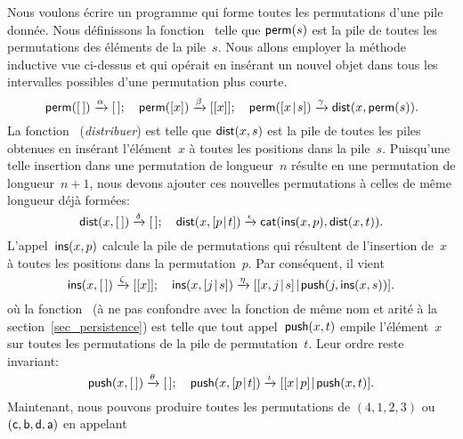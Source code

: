 Nous voulons écrire un programme qui forme toutes les permutations
d'une pile donnée. Nous définissons la
fonction~ telle que
\(\textsf{perm}(s)\) est la pile de toutes les permutations des éléments
de la pile~\(s\). Nous allons employer la méthode inductive vue
ci-dessus et qui opérait en insérant un nouvel objet dans tous les
intervalles possibles d'une permutation plus courte.
\begin{equation*}
\textsf{perm}([\,])         \xrightarrow{\smash{\alpha}} [\,];\quad
\textsf{perm}([x])         \xrightarrow{\smash{\beta}} [[x]];\quad
\textsf{perm}([{x}\!\mid\!{s}]) \xrightarrow{\gamma}
                          \textsf{dist}(x,\textsf{perm}(s)).
\end{equation*}
La fonction~ (\emph{distribuer})
est telle que \(\textsf{dist}(x,s)\) est la pile de toutes les piles
obtenues en insérant l'élément~\(x\) à toutes les positions dans la
pile~\(s\). Puisqu'une telle insertion dans une permutation de
longueur~\(n\) résulte en une permutation de longueur~\(n+1\), nous
devons ajouter ces nouvelles permutations à celles de même longueur
déjà formées:
\begin{equation*}
\textsf{dist}(x,[\,])         \xrightarrow{\smash{\delta}} [\,];\quad
\textsf{dist}(x,[{p}\!\mid\!{t}]) \xrightarrow{\smash{\epsilon}}
                            \textsf{cat}(\textsf{ins}(x,p),\textsf{dist}(x,t)).
\end{equation*}
L'appel~\(\textsf{ins}(x,p)\) calcule la pile de
permutations qui résultent de l'insertion de~\(x\) à toutes les
positions dans la permutation~\(p\). Par conséquent, il vient
\begin{equation*}
\textsf{ins}(x,[\,]) \xrightarrow{\smash{\zeta}} [[x]];\quad
\textsf{ins}(x,[{j}\!\mid\!{s}]) \xrightarrow{\smash{\eta}}
 [{[{x,j}\!\mid\!{s}]}\!\mid\!{\textsf{push}(j,\textsf{ins}(x,s))}].
\end{equation*}
où la fonction~ (à ne pas
confondre avec la fonction de même nom et arité à la
section~\ref{sec_persistence}) est telle que tout
appel~\(\textsf{push}(x,t)\) empile l'élément~\(x\) sur toutes les
permutations de la pile de permutation~\(t\). Leur ordre reste
invariant:
\begin{equation*}
\textsf{push}(x,[\,]) \xrightarrow{\smash{\theta}} [\,];\quad
\textsf{push}(x,[{p}\!\mid\!{t}]) \xrightarrow{\smash{\iota}}
 [{[{x}\!\mid\!{p}]}\!\mid\!{\textsf{push}(x,t)}].
\end{equation*}
Maintenant, nous pouvons produire toutes les permutations de
\((4,1,2,3)\) ou \((\textsf{c}, \textsf{b}, \textsf{d}, \textsf{a})\) en appelant
